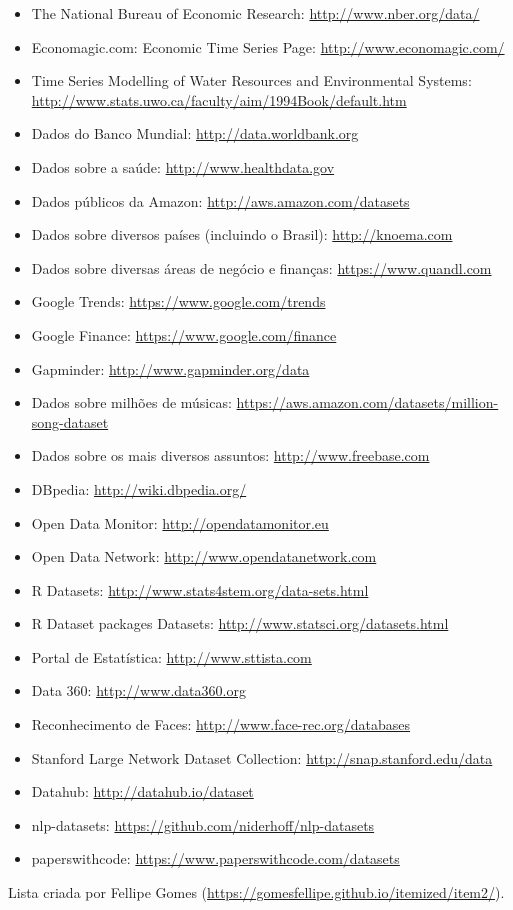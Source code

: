 \begin{frame}[allowframebreaks]
\begin{itemize}
\item The National Bureau of Economic Research: \url{http://www.nber.org/data/}
\item Economagic.com: Economic Time Series Page: \url{http://www.economagic.com/}
\item Time Series Modelling of Water Resources and Environmental Systems: \url{http://www.stats.uwo.ca/faculty/aim/1994Book/default.htm}
\item Dados do Banco Mundial: \url{http://data.worldbank.org}
\item Dados sobre a saúde: \url{http://www.healthdata.gov}
\item Dados públicos da Amazon: \url{http://aws.amazon.com/datasets}
\item Dados sobre diversos países (incluindo o Brasil): \url{http://knoema.com}
\item Dados sobre diversas áreas de negócio e finanças: \url{https://www.quandl.com}
\item Google Trends: \url{https://www.google.com/trends}
\item Google Finance: \url{https://www.google.com/finance}
\item Gapminder: \url{http://www.gapminder.org/data}
\item Dados sobre milhões de músicas: \url{https://aws.amazon.com/datasets/million-song-dataset}
\item Dados sobre os mais diversos assuntos: \url{http://www.freebase.com}
\item DBpedia: \url{http://wiki.dbpedia.org/}
\item Open Data Monitor: \url{http://opendatamonitor.eu}
\item Open Data Network: \url{http://www.opendatanetwork.com}
\item R Datasets: \url{http://www.stats4stem.org/data-sets.html}
\item R Dataset packages Datasets: \url{http://www.statsci.org/datasets.html}
\item Portal de Estatística: \url{http://www.sttista.com}
\item Data 360: \url{http://www.data360.org}
\item Reconhecimento de Faces: \url{http://www.face-rec.org/databases}
\item Stanford Large Network Dataset Collection: \url{http://snap.stanford.edu/data}
\item Datahub: \url{http://datahub.io/dataset}
\item nlp-datasets: \url{https://github.com/niderhoff/nlp-datasets}
\item paperswithcode: \url{https://www.paperswithcode.com/datasets}
\end{itemize}

Lista criada por Fellipe Gomes (\url{https://gomesfellipe.github.io/itemized/item2/}).
\end{frame}



